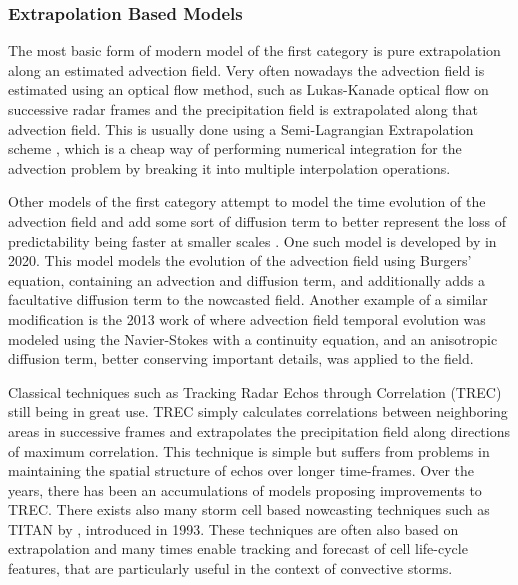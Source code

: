 \subsubsection*{Extrapolation Based Models}

The most basic form of modern model of the first category is pure extrapolation along an estimated advection field. Very often nowadays the advection field is estimated using an optical flow method, such as Lukas-Kanade optical flow \cite{lucas1981iterative} on successive radar frames and the precipitation field is extrapolated along that advection field. This is usually done using a Semi-Lagrangian Extrapolation scheme \cite{staniforth_semi-lagrangian_1991}, which is a cheap way of performing numerical integration for the advection problem by breaking it into multiple interpolation operations. 

Other models of the first category attempt to model the time evolution of the advection field and add some sort of diffusion term to better represent the loss of predictability being faster at smaller scales \cite{germann2002scale}. One such model is developed by \citet{ryu_improved_2020} in 2020. This model models the evolution of the advection field using Burgers' equation, containing an advection and diffusion term, and additionally adds a facultative diffusion term to the nowcasted field. Another example of a similar modification is the 2013 work of \citet{sakaino_spatio-temporal_2013} where advection field temporal evolution was modeled using the Navier-Stokes with a continuity equation, and an anisotropic diffusion term, better conserving important details, was applied to the field. 

Classical techniques such as Tracking Radar Echos through Correlation (TREC) \cite{rinehart_three-dimensional_1978} still being in great use. TREC simply calculates correlations between neighboring areas in successive frames and extrapolates the precipitation field along directions of maximum correlation. This technique is simple but suffers from problems in maintaining the spatial structure of echos over longer time-frames. Over the years, there has been an accumulations of models proposing improvements to TREC. There exists also many storm cell based nowcasting techniques such as TITAN by \citet{dixon1993titan}, introduced in 1993. These techniques are often also based on extrapolation and many times enable tracking and forecast of cell life-cycle features, that are particularly useful in the context of convective storms. 

